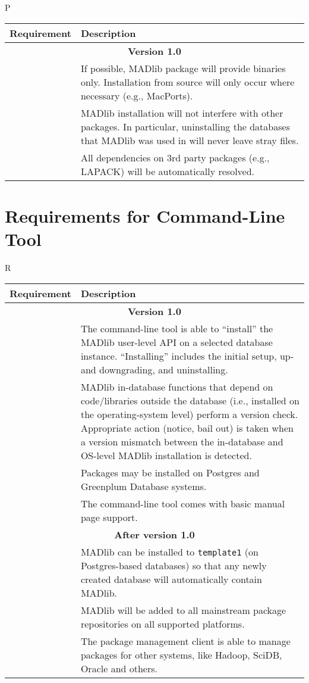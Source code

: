 \documentclass[11pt]{article}
\begin{document}
{\begin{mlreq}{P}
\begin{tabular}{|l|p{133mm}|}
\hline
	\textbf{Requirement} & \textbf{Description} \\
\hline
	\multicolumn{2}{|c|}{\bf Version 1.0} \\
\hline
	\mlr & If possible, MADlib package will provide binaries only. Installation from source will only occur where necessary (e.g., MacPorts). \\
\hline
	\mlr & MADlib installation will not interfere with other packages. In particular, uninstalling the databases that MADlib was used in will never leave stray files. \\
\hline
	\mlr & All dependencies  on 3rd party packages (e.g., LAPACK) will be automatically resolved. \\
\hline

\end{tabular}
\end{mlreq}

\section{Requirements for Command-Line Tool}
	
\begin{mlreq}{R}
\begin{tabular}{|l|p{133mm}|}
\hline
	\textbf{Requirement} & \textbf{Description} \\
\hline
	\multicolumn{2}{|c|}{\bf Version 1.0} \\
\hline
	\mlr & The command-line tool is able to ``install'' the MADlib user-level API on a selected database instance. ``Installing'' includes the initial setup, up\nobreakdash- and downgrading, and uninstalling. \\
\hline
	\mlr & MADlib in-database functions that depend on code/libraries outside the database (i.e., installed on the operating-system level) perform a version check. Appropriate action (notice, bail out) is taken when a version mismatch between the in-database and OS-level MADlib installation is detected. \\
\hline
	\mlr & Packages may be installed on Postgres and Greenplum Database systems. \\
\hline
	\mlr & The command-line tool comes with basic manual page support.\\
\hline
	\multicolumn{2}{|c|}{\bf After version 1.0} \\
\hline
	\mlr & MADlib can be installed to \texttt{template1} (on Postgres-based databases) so that any
newly created database will automatically contain MADlib. \\
\hline
	\mlr & MADlib will be added to all mainstream package repositories on all supported platforms. \\
\hline
	\mlr & The package management client is able to manage packages for other
		   systems, like Hadoop, SciDB, Oracle and others. \\
\hline


\end{tabular}
\end{mlreq}}
\end{document}
